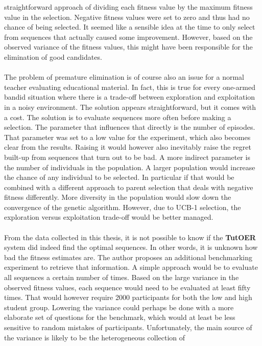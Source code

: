 straightforward approach of dividing each fitness value by the maximum fitness
value in the selection. Negative fitness values were set to zero and thus had
no chance of being selected. It seemed like a sensible idea at the time to only
select from sequences that actually caused some improvement. However, based on
the observed variance of the fitness values, this might have been responsible
for the elimination of good candidates.\\\\
\noindent
The problem of premature elimination is of course also an issue for a normal
teacher evaluating educational material. In fact, this is true for every
one-armed bandid situation where there is a trade-off between exploration and
exploitation in a noisy environment. The solution appears straightforward, but
it comes with a cost. The solution is to evaluate sequences more often before
making a selection. The parameter that influences that directly is the number
of episodes. That parameter was set to a low value for the experiment, which
also becomes clear from the results. Raising it would however also inevitably
raise the regret built-up from sequences that turn out to be bad. A more
indirect parameter is the number of individuals in the population. A larger
population would increase the chance of any individual to be selected.
In particular if that would be combined with a different approach to parent
selection that deals with negative fitness differently. More diversity in the
population would slow down the convergence of the genetic algorithm. However,
due to UCB-1 selection, the exploration versus exploitation trade-off would be
better managed.\\\\
\noindent
From the data collected in this thesis, it is not possible to know if the
\textbf{TutOER} system did indeed find the optimal sequences. In other words,
it is unknown how bad the fitness estimates are. The author proposes an
additional benchmarking experiment to retrieve that information. A simple
approach would be to evaluate all sequences a certain number of times. Based on
the large variance in the observed fitness values, each sequence would need to
be evaluated at least fifty times. That would however require 2000 participants
for both the low and high student group. Lowering the variance could perhaps be
done with a more elaborate set of questions for the benchmark, which would at
least be less sensitive to random mistakes of participants. Unfortunately, the main
source of the variance is likely to be the heterogeneous collection of
